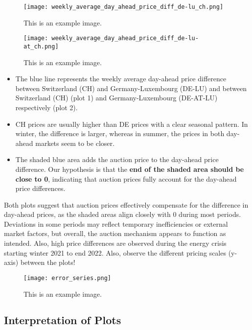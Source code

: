 \documentclass[12pt]{article}
\begin{document}
\begin{figure}[h!]
    \centering
    \texttt{[image: weekly\_average\_day\_ahead\_price\_diff\_de-lu\_ch.png]}
    \caption{This is an example image.}
    \label{fig:1}
\end{figure}

\begin{figure}[h!]
    \centering
    \texttt{[image: weekly\_average\_day\_ahead\_price\_diff\_de-lu-at\_ch.png]}
    \caption{This is an example image.}
    \label{fig:1}
\end{figure}

\begin{itemize}
    \item The blue line represents the weekly average day-ahead price difference between Switzerland (CH) and Germany-Luxembourg (DE-LU) and between Switzerland (CH) (plot 1) and Germany-Luxembourg (DE-AT-LU) respectively (plot 2).
    \item CH prices are usually higher than DE prices with a clear seasonal pattern. In winter, the difference is larger, whereas in summer, the prices in both day-ahead markets seem to be closer.
    \item The shaded blue area adds the auction price to the day-ahead price difference. Our hypothesis is that the \textbf{end of the shaded area should be close to 0}, indicating that auction prices fully account for the day-ahead price differences.
\end{itemize}

\noindent
Both plots suggest that auction prices effectively compensate for the difference in day-ahead prices, as the shaded areas align closely with 0 during most periods. Deviations in some periods may reflect temporary inefficiencies or external market factors, but overall, the auction mechanism appears to function as intended.
Also, high price differences are observed during the energy crisis starting winter 2021 to end 2022. Also, observe the different pricing scales (y-axis) between the plots!

\begin{figure}[h!]
    \centering
    \texttt{[image: error\_series.png]}
    \caption{This is an example image.}
    \label{fig:1}
\end{figure}
\newpage
\subsection{Interpretation of Plots}
\end{document}
